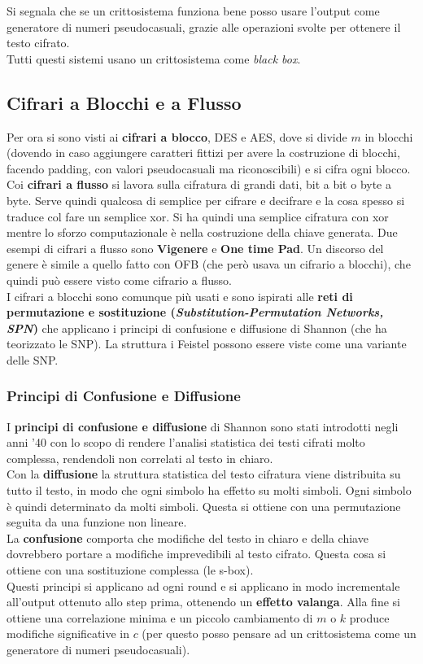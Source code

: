 \documentclass[a4paper,12pt, oneside]{book}
\begin{document}
Si segnala che se un crittosistema funziona bene posso usare l'output come
generatore di numeri pseudocasuali, grazie alle operazioni svolte per ottenere
il testo cifrato.\\
Tutti questi sistemi usano un crittosistema come \textit{black box}.\\
\subsection{Cifrari a Blocchi e a Flusso}
Per ora si sono visti ai \textbf{cifrari a blocco}, DES e AES, dove si divide
$m$ in blocchi (dovendo in caso aggiungere caratteri fittizi per avere la
costruzione di blocchi, facendo padding,
con valori pseudocasuali ma riconoscibili) e si cifra ogni blocco.\\
Coi \textbf{cifrari a flusso} si lavora sulla cifratura di grandi dati, bit a
bit o byte a byte. Serve quindi qualcosa di semplice per cifrare e decifrare e
la cosa spesso si traduce col fare un semplice xor. Si ha quindi una semplice
cifratura con xor mentre lo sforzo computazionale è nella costruzione della
chiave generata. Due esempi di cifrari a flusso sono \textbf{Vigenere} e
\textbf{One time Pad}. Un discorso del genere è simile a quello fatto con OFB
(che però usava un cifrario a blocchi), che quindi può essere visto come
cifrario a flusso.\\
I cifrari a blocchi sono comunque più usati e sono ispirati alle \textbf{reti di
permutazione e sostituzione (\textit{Substitution-Permutation Networks, SPN})}
che applicano i principi di confusione e diffusione di Shannon (che ha
teorizzato le SNP). La struttura i Feistel possono essere viste come una
variante delle SNP.
\subsubsection{Principi di Confusione e Diffusione}
I \textbf{principi di confusione e diffusione} di Shannon sono stati introdotti
negli anni '40 con lo scopo di rendere l'analisi statistica dei testi cifrati
molto complessa, rendendoli non correlati al testo in chiaro. \\
Con la \textbf{diffusione} la struttura statistica del testo cifratura viene
distribuita 
su tutto il testo, in modo che ogni simbolo ha effetto su molti simboli. Ogni
simbolo è quindi determinato da molti simboli. Questa si ottiene con una
permutazione seguita da una funzione non lineare.\\
La \textbf{confusione} comporta che modifiche del testo in chiaro e della chiave
dovrebbero portare a modifiche imprevedibili al testo cifrato. Questa cosa si
ottiene con una sostituzione complessa (le s-box). \\
Questi principi si applicano ad ogni round e si applicano in modo incrementale
all'output ottenuto allo step prima, ottenendo un \textbf{effetto valanga}. Alla
fine si ottiene una correlazione minima e un piccolo cambiamento di $m$ o $k$
produce modifiche significative in $c$ (per questo posso pensare ad un
crittosistema come un generatore di numeri pseudocasuali). \\
\end{document}
